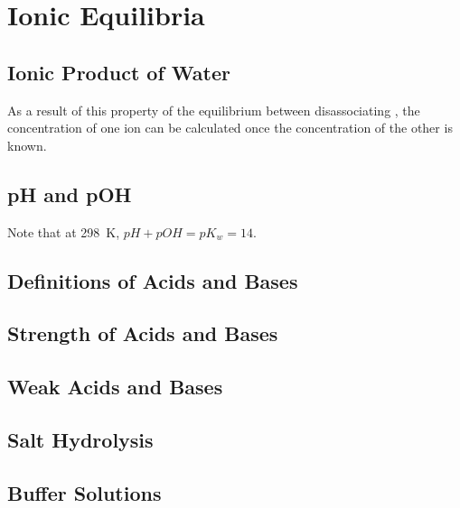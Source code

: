\documentclass[../main]{subfiles}
\begin{document}
\section{Ionic Equilibria}

	\subsection{Ionic Product of Water}



	As a result of this property of the equilibrium between disassociating , the concentration of one ion can be calculated once the concentration of the other is known.

	\subsection{pH and pOH}




	Note that at \SI{298}{\K}, \(pH + pOH = pK_w = 14 \).

	\subsection{Definitions of Acids and Bases}

	\subsection{Strength of Acids and Bases}

	\subsection{Weak Acids and Bases}



	\subsection{Salt Hydrolysis}

	\subsection{Buffer Solutions}
\end{document}
